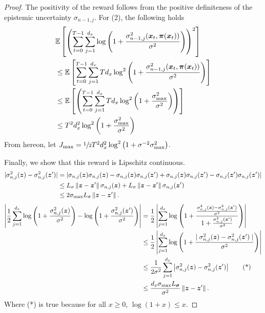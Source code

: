 \begin{proof}
    The positivity of the reward follows from the positive definiteness of the epistemic uncertainty $\sigma_{n-1, j}$. For (2), the following holds
    \begin{align*}
        &\mathbb{E}\left[\left(\sum_{t=0}^{T-1} \sum^{d_x}_{j=1} \log \left(1 + \frac{\sigma_{n-1, j}^2({\bm{x}}_t, {\bm{\pi}}({\bm{x}}_t))}{\sigma^2}\right)\right)^2\right] \\
        &\leq  \mathbb{E}\left[\sum_{t=0}^{T-1} \sum^{d_x}_{j=1} T d_x \log^2 \left(1 + \frac{\sigma_{n-1, j}^2({\bm{x}}_t, {\bm{\pi}}({\bm{x}}_t))}{\sigma^2}\right)\right] \\
        &\leq \mathbb{E}\left[\left(\sum_{t=0}^{T-1} \sum^{d_x}_{j=1} T d_x \log^2 \left(1 + \frac{\sigma^2_{\max}}{\sigma^2}\right)\right)\right] \\
        &\leq T^2 d^2_x \log^2 \left(1 + \frac{\sigma^2_{\max}}{\sigma^2}\right)
    \end{align*}
    From hereon, let $J_{\max} = \sfrac{1}{2} T^2 d^2_x \log^2 \left(1 + \sigma^{-2}\sigma^2_{\max}\right)$.
    
      Finally, we show that this reward is Lipschitz continuous. 
    \begin{align*}
        \lvert\sigma^2_{n, j}({\bm{z}})  -  \sigma^2_{n, j}({\bm{z}}')\rvert &= 
         \vert\sigma_{n, j}({\bm{z}})  \sigma_{n, j}({\bm{z}}) -  \sigma_{n, j}({\bm{z}})\sigma_{n, j}({\bm{z}}') + \sigma_{n, j}({\bm{z}})\sigma_{n, j}({\bm{z}}') - \sigma_{n, j}({\bm{z}}')  \sigma_{n, j}({\bm{z}}')\rvert \\
         &\leq L_{\sigma}\left\lVert{\bm{z}} - {\bm{z}}'\right\rVert \sigma_{n, j}({\bm{z}}) +  L_{\sigma}\left\lVert{\bm{z}} - {\bm{z}}'\right\rVert \sigma_{n, j}({\bm{z}}') \\
         &\leq 2\sigma_{\max}L_{\sigma}\left\lVert{\bm{z}} - {\bm{z}}'\right\rVert.
    \end{align*}
    \begin{align*}
            \left\vert \frac{1}{2}\sum^{d_x}_{j=1} \log \left(1 + \frac{\sigma_{n, j}^2({\bm{z}})}{\sigma^{2}}\right) - \log \left(1 + \frac{\sigma_{n, j}^2({\bm{z}}')}{\sigma^{2}}\right) \right\vert
            &= \frac{1}{2}\left\vert \sum^{d_x}_{j=1} \log\left(1+\frac{
            \frac{\sigma^2_{n, j}({\bm{z}}) - \sigma^2_{n, j}({\bm{z}}') }{\sigma^2}
            }{1 + \frac{\sigma^2_{n, j}({\bm{z}}')}{\sigma^2}}\right)\right\vert \\
            &\leq \frac{1}{2} \left\vert \sum^{d_x}_{j=1} \log\left(1+
            \frac{\mid\sigma^2_{n, j}({\bm{z}}) - \sigma^2_{n, j}({\bm{z}}') \mid}{\sigma^2}\right)\right\vert \\
            &\leq \frac{1}{2 \sigma^2} \sum^{d_x}_{j=1} \left\vert\sigma^2_{n, j}({\bm{z}}) - 
            \sigma^2_{n, j}({\bm{z}}')\right\vert \tag{*}\\
            &\leq \frac{d_x\sigma_{\max} L_{{\bm{\sigma}}}}{\sigma^2} \left\lVert{\bm{z}} - {\bm{z}}'\right\rVert.
\end{align*}
Where (*) is true because for all $x\geq 0$, $\log(1 + x) \leq x$.
\end{proof}

